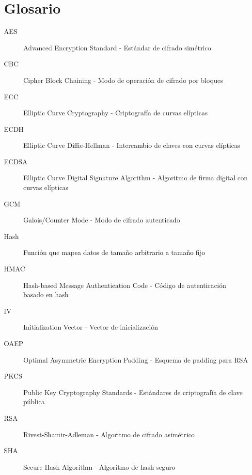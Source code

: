 \documentclass[12pt,a4paper]{article}
\begin{document}
\section{Glosario}

\begin{description}
	\item[AES] Advanced Encryption Standard - Estándar de cifrado simétrico
	\item[CBC] Cipher Block Chaining - Modo de operación de cifrado por bloques
	\item[ECC] Elliptic Curve Cryptography - Criptografía de curvas elípticas
	\item[ECDH] Elliptic Curve Diffie-Hellman - Intercambio de claves con curvas elípticas
	\item[ECDSA] Elliptic Curve Digital Signature Algorithm - Algoritmo de firma digital con curvas elípticas
	\item[GCM] Galois/Counter Mode - Modo de cifrado autenticado
	\item[Hash] Función que mapea datos de tamaño arbitrario a tamaño fijo
	\item[HMAC] Hash-based Message Authentication Code - Código de autenticación basado en hash
	\item[IV] Initialization Vector - Vector de inicialización
	\item[OAEP] Optimal Asymmetric Encryption Padding - Esquema de padding para RSA
	\item[PKCS] Public Key Cryptography Standards - Estándares de criptografía de clave pública
	\item[RSA] Rivest-Shamir-Adleman - Algoritmo de cifrado asimétrico
	\item[SHA] Secure Hash Algorithm - Algoritmo de hash seguro
\end{description}
\end{document}
